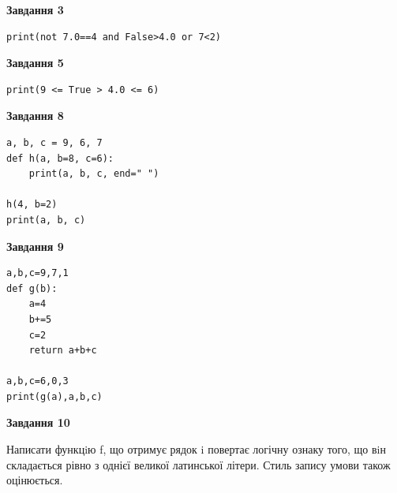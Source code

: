 \documentclass[12pt, ukrainian]{article}
\begin{document}
{\begin {large}
\begin{minipage}[t]{7.5cm}
\end{minipage}
\vline \hspace{6mm}
\begin{minipage}[t]{10.5cm}

\begin{center}
\textbf{Завдання 3}
\end{center}

\begin{verbatim}
print(not 7.0==4 and False>4.0 or 7<2)
\end{verbatim}



\begin{center}
\textbf{Завдання 5}
\end{center}

\begin{verbatim}
print(9 <= True > 4.0 <= 6)
\end{verbatim}



\begin{center}
\textbf{Завдання 8}
\end{center}

\begin{verbatim}
a, b, c = 9, 6, 7
def h(a, b=8, c=6):
    print(a, b, c, end=" ")

h(4, b=2)
print(a, b, c)
\end{verbatim}



\begin{center}
\textbf{Завдання 9}
\end{center}

\begin{verbatim}
a,b,c=9,7,1
def g(b):
    a=4
    b+=5
    c=2
    return a+b+c

a,b,c=6,0,3
print(g(a),a,b,c)
\end{verbatim}



\begin{center}
\textbf{Завдання 10}
\end{center}

Написати функцiю f, що отримує рядок i повертає логічну ознаку того, що вiн складається рівно з однієї великої латинської літери. Стиль запису умови також оцінюється.\par

\end{minipage}

\end {large}}
\newpage
\end{document}
